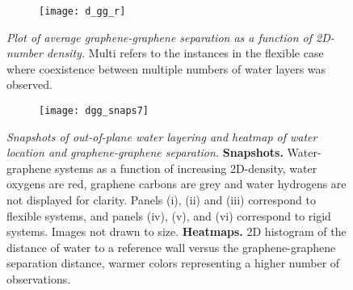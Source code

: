 \documentclass[12pt]{article}
\begin{document}
\begin{figure}[h!]
	\centering
	\begin{subfigure}[b]{0.49\textwidth}
    		\texttt{[image: d\_gg\_r]}
  	\end{subfigure}
	\caption{\textit{Plot of average graphene-graphene separation as a function of 2D-number density.} Multi refers to the instances in the flexible case where coexistence between multiple numbers of water layers was observed.}
	\label{fig:dgg_1}
\end{figure}


\begin{figure}[h!]
	\centering
	\begin{subfigure}[b]{0.99\textwidth}
    		\texttt{[image: dgg\_snaps7]}
  	\end{subfigure}
	\caption{\textit{Snapshots of out-of-plane water layering and heatmap of water location and graphene-graphene separation.} \textbf{Snapshots.} Water-graphene systems as a function of increasing 2D-density, water oxygens are red, graphene carbons are grey and water hydrogens are not displayed for clarity. Panels (i), (ii) and (iii) correspond to flexible systems, and panels (iv), (v), and (vi) correspond to rigid systems. Images not drawn to size. \textbf{Heatmaps.} 2D histogram of the distance of water to a reference wall versus the graphene-graphene separation distance, warmer colors representing a higher number of observations.}
	\label{fig:dgg_2}
\end{figure}
\end{document}
